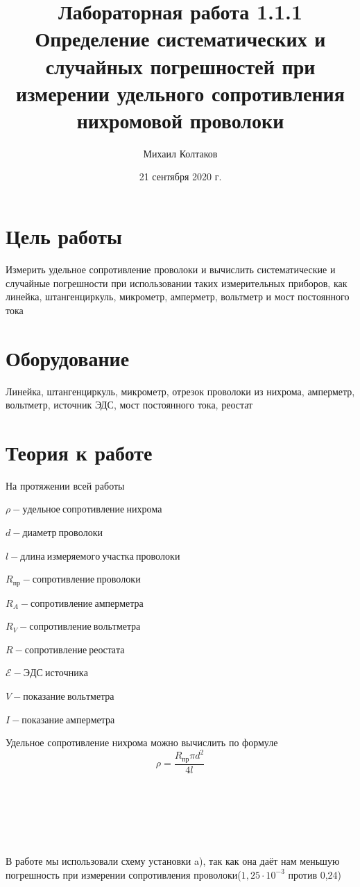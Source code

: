 \documentclass[a4paper, 12pt]{article}
\title{Лабораторная работа 1.1.1 Определение систематических и случайных погрешностей при измерении удельного сопротивления нихромовой проволоки}
\author{Михаил Колтаков}
\date{21 сентября 2020 г.}
\begin{document}
	\maketitle
	\section*{Цель работы}
		Измерить удельное сопротивление проволоки и вычислить систематические и случайные погрешности при использовании таких измерительных приборов, как линейка, штангенциркуль, микрометр, амперметр, вольтметр и мост постоянного тока
	\section*{Оборудование}
		Линейка, штангенциркуль, микрометр, отрезок проволоки из нихрома, амперметр, вольтметр, источник ЭДС, мост постоянного тока, реостат
	\section*{Теория к работе}
		На протяжении всей работы
		
		$\rho - удельное\: сопротивление\: нихрома$
		
		$d - диаметр\: проволоки$
		
		$l - длина\: измеряемого\: участка\: проволоки$
		
		$R_{пр} - сопротивление\: проволоки$
		
		$R_A - сопротивление\: амперметра$
		
		$R_V -  сопротивление\: вольтметра$
		
		$R - сопротивление\: реостата$
		
		$\mathscr{E} - ЭДС\: источника$
		
		$V - показание\: вольтметра$
		
		$I - показание\: амперметра$
		\par
		Удельное сопротивление нихрома можно вычислить по формуле
		$$\rho = \frac{R_{пр}\pi d^2}{4l}$$\\
		\\
		\\
		\\
		\\
		\\
		
		В работе мы использовали схему установки a), так как она даёт нам меньшую погрешность при измерении сопротивления проволоки($1,25\cdot10^{-3}$ против 0,24)\\
		
\end{document}
